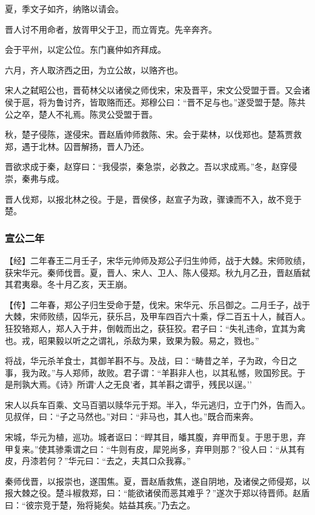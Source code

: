 \documentclass[]{article}
\begin{document}
夏，季文子如齐，纳赂以请会。

晋人讨不用命者，放胥甲父于卫，而立胥克。先辛奔齐。

会于平州，以定公位。东门襄仲如齐拜成。

六月，齐人取济西之田，为立公故，以赂齐也。

宋人之弑昭公也，晋荀林父以诸侯之师伐宋，宋及晋平，宋文公受盟于晋。又会诸侯于扈，将为鲁讨齐，皆取赂而还。郑穆公曰：``晋不足与也。''遂受盟于楚。陈共公之卒，楚人不礼焉。陈灵公受盟于晋。

秋，楚子侵陈，遂侵宋。晋赵盾帅师救陈、宋。会于棐林，以伐郑也。楚蒍贾救郑，遇于北林。囚晋解扬，晋人乃还。

晋欲求成于秦，赵穿曰：``我侵崇，秦急崇，必救之。吾以求成焉。''冬，赵穿侵崇，秦弗与成。

晋人伐郑，以报北林之役。于是，晋侯侈，赵宣子为政，骤谏而不入，故不竞于楚。

\hypertarget{header-n1306}{%
\subsubsection{宣公二年}\label{header-n1306}}

【经】二年春王二月壬子，宋华元帅师及郑公子归生帅师，战于大棘。宋师败绩，获宋华元。秦师伐晋。夏，晋人、宋人、卫人、陈人侵郑。秋九月乙丑，晋赵盾弑其君夷皋。冬十月乙亥，天王崩。

【传】二年春，郑公子归生受命于楚，伐宋。宋华元、乐吕御之。二月壬子，战于大棘，宋师败绩，囚华元，获乐吕，及甲车四百六十乘，俘二百五十人，馘百人。狂狡辂郑人，郑人入于井，倒戟而出之，获狂狡。君子曰：``失礼违命，宜其为禽也。戎，昭果毅以听之之谓礼，杀敌为果，致果为毅。易之，戮也。''

将战，华元杀羊食士，其御羊斟不与。及战，曰：``畴昔之羊，子为政，今日之事，我为政。''与人郑师，故败。君子谓：``羊斟非人也，以其私憾，败国殄民。于是刑孰大焉。《诗》所谓`人之无良'者，其羊斟之谓乎，残民以逞。''

宋人以兵车百乘、文马百驷以赎华元于郑。半入，华元逃归，立于门外，告而入。见叔佯，曰：``子之马然也。''对曰：``非马也，其人也。''既合而来奔。

宋城，华元为植，巡功。城者讴曰：``睅其目，皤其腹，弃甲而复。于思于思，弃甲复来。''使其骖乘谓之曰：``牛则有皮，犀兕尚多，弃甲则那？''役人曰：``从其有皮，丹漆若何？''华元曰：``去之，夫其口众我寡。''

秦师伐晋，以报崇也，遂围焦。夏，晋赵盾救焦，遂自阴地，及诸侯之师侵郑，以报大棘之役。楚斗椒救郑，曰：``能欲诸侯而恶其难乎？''遂次于郑以待晋师。赵盾曰：``彼宗竞于楚，殆将毙矣。姑益其疾。''乃去之。
\end{document}

